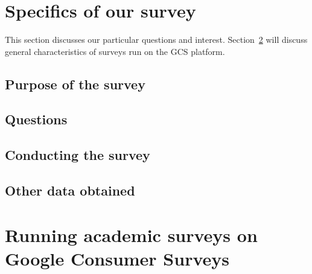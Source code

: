 \documentclass[12pt,titlepage]{article}
\date{\myversion
}
\title{\mytitle}
\author{Lars Vilhuber}
\begin{document}
 \maketitle



	\thispagestyle{empty}
	\singlespacing
%		

	 \newpage
	 \setcounter{page}{1}
\section{Specifics of our survey}
This section discusses our particular questions and interest. Section~\ref{sec:general_gcs} will discuss general characteristics of surveys run on the \ac{GCS} platform.

\subsection{Purpose of the survey}
\label{sec:intro}



\subsection{Questions}
\label{sec:questions}

\clearpage

\subsection{Conducting the survey}
\label{sec:conducting_specifics}


\subsection{Other data obtained}
\label{sec:data}


\section{Running academic surveys on Google Consumer Surveys}
\label{sec:general_gcs}
\end{document}
